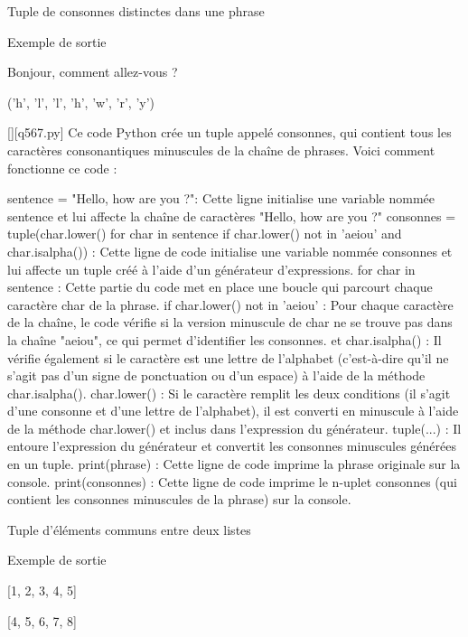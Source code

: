         \question
        Tuple de consonnes distinctes dans une phrase

Exemple de sortie

Bonjour, comment allez-vous ?

('h', 'l', 'l', 'h', 'w', 'r', 'y')
        \par
        \begin{solution}
            \renewcommand{\nomfichier}{q567.py}
            \pythonfile{\chemincode \nomfichier}[][\nomfichier]
            Ce code Python crée un tuple appelé consonnes, qui contient tous les caractères consonantiques minuscules de la chaîne de phrases. Voici comment fonctionne ce code :

    sentence = "Hello, how are you ?": Cette ligne initialise une variable nommée sentence et lui affecte la chaîne de caractères "Hello, how are you ?"
    consonnes = tuple(char.lower() for char in sentence if char.lower() not in 'aeiou' and char.isalpha()) : Cette ligne de code initialise une variable nommée consonnes et lui affecte un tuple créé à l'aide d'un générateur d'expressions.
        for char in sentence : Cette partie du code met en place une boucle qui parcourt chaque caractère char de la phrase.
        if char.lower() not in 'aeiou' : Pour chaque caractère de la chaîne, le code vérifie si la version minuscule de char ne se trouve pas dans la chaîne "aeiou", ce qui permet d'identifier les consonnes.
        et char.isalpha() : Il vérifie également si le caractère est une lettre de l'alphabet (c'est-à-dire qu'il ne s'agit pas d'un signe de ponctuation ou d'un espace) à l'aide de la méthode char.isalpha().
        char.lower() : Si le caractère remplit les deux conditions (il s'agit d'une consonne et d'une lettre de l'alphabet), il est converti en minuscule à l'aide de la méthode char.lower() et inclus dans l'expression du générateur.
        tuple(...) : Il entoure l'expression du générateur et convertit les consonnes minuscules générées en un tuple.
    print(phrase) : Cette ligne de code imprime la phrase originale sur la console.
    print(consonnes) : Cette ligne de code imprime le n-uplet consonnes (qui contient les consonnes minuscules de la phrase) sur la console.
        \end{solution}
        

        \question
        Tuple d'éléments communs entre deux listes

Exemple de sortie

[1, 2, 3, 4, 5]

[4, 5, 6, 7, 8]

